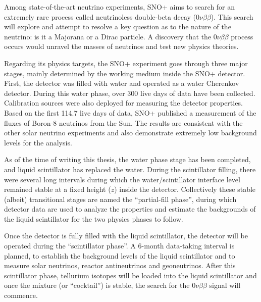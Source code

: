 
Among state-of-the-art neutrino experiments, SNO+ aims to search for an extremely rare process called neutrinoless double-beta decay ($0\nu\beta\beta$). This search will explore and attempt to resolve a key question as to the nature of the neutrino: is it a Majorana or a Dirac particle. A discovery that  the $0\nu\beta\beta$ process occurs would unravel the masses of neutrinos and test new physics theories.

Regarding its physics targets, the SNO+ experiment goes through three major stages, mainly determined by the working medium inside the SNO+ detector. First, the detector was filled with water and operated as a water Cherenkov detector. During this water phase, over 300 live days of data have been collected. Calibration sources were also deployed for measuring the detector properties. Based on the first 114.7 live days of data, SNO+ published a measurement of the fluxes of Boron-8 neutrinos from the Sun. The results are consistent with the other solar neutrino experiments and also demonstrate  extremely low background levels for the analysis\cite{anderson2019measurement}.

As of the time of writing this thesis, the water phase stage has been completed, and liquid scintillator has replaced the water. During the scintillator filling, there were several long intervals during which the water/scintillator interface level remained stable at a fixed height ($z$) inside the detector. Collectively these stable (albeit) transitional stages are named the ``partial-fill phase'', during which detector data are used to analyze the properties and estimate the backgrounds of the liquid scintillator for the two physics phases to follow.

Once the detector is fully filled with the liquid scintillator, the detector will be operated during the ``scintillator phase''. A 6-month data-taking interval is planned, to establish the background levels of the liquid scintillator and to measure solar neutrinos, reactor antineutrinos and geoneutrinos\cite{directorReview}. After this scintillator phase, tellurium isotopes will be loaded into the liquid scintillator and once the mixture (or ``cocktail'') is stable, the search for the $0\nu\beta\beta$ signal will commence.

